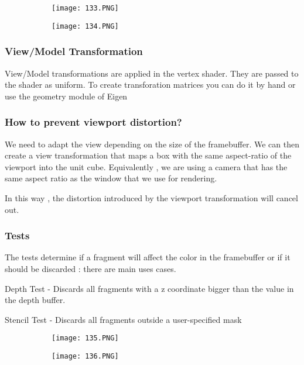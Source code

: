 \documentclass{article}
\begin{document}
\begin{figure}[ht!]
  \centering
  \begin{subfigure}[b]{0.49\linewidth}
    \texttt{[image: 133.PNG]}
  \end{subfigure}
  \begin{subfigure}[b]{0.49\textwidth}
         \centering
         \texttt{[image: 134.PNG]}
     \end{subfigure}
\end{figure}

\subsubsection{View/Model Transformation}

View/Model transformations are applied in the vertex shader.
They are passed to the shader as uniform.
To create transforation matrices you can do it by hand or use the geometry module of Eigen

\subsubsection{How to prevent viewport distortion?}

We need to adapt the view depending on the size of the framebuffer. We can then create a view transformation that maps a box with the same aspect-ratio of the viewport into the unit cube.
Equivalently , we are using a camera that has the same aspect ratio as the window that we use for rendering.

In this way , the distortion introduced by the viewport transformation will cancel out.

\subsubsection{Tests}

The tests determine if a fragment will affect the color in the framebuffer or if it should be discarded : there are main uses cases.

Depth Test - Discards all fragments with a z coordinate bigger than the value in the depth buffer.

Stencil Test - Discards all fragments outside a user-specified mask

\begin{figure}[ht!]
  \centering
  \begin{subfigure}[b]{0.49\linewidth}
    \texttt{[image: 135.PNG]}
  \end{subfigure}
  \begin{subfigure}[b]{0.49\textwidth}
         \centering
         \texttt{[image: 136.PNG]}
     \end{subfigure}
\end{figure}
\end{document}
